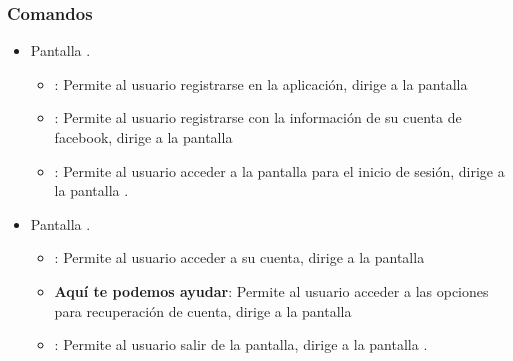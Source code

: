 \subsubsection{Comandos}
    \begin{itemize}
    	
    	\item Pantalla .
    	
    	\begin{itemize}
    		\item {}: Permite al usuario registrarse en la aplicación, dirige a la pantalla 
    		\item {}: Permite al usuario registrarse con la información de su cuenta de facebook, dirige a la pantalla
    		\item {}: Permite al usuario acceder a la pantalla para el inicio de sesión, dirige a la pantalla . 
    	\end{itemize}
    
		\item Pantalla .
		
		\begin{itemize}
			\item {}:  Permite al usuario acceder a su cuenta, dirige a la pantalla
			\item \textbf{Aquí te podemos ayudar}: Permite al usuario acceder a las opciones para recuperación de cuenta, dirige a la pantalla 
			\item \btnRegresar [Regresar]: Permite al usuario salir de la pantalla, dirige a la pantalla . 
		\end{itemize}
    \end{itemize}

